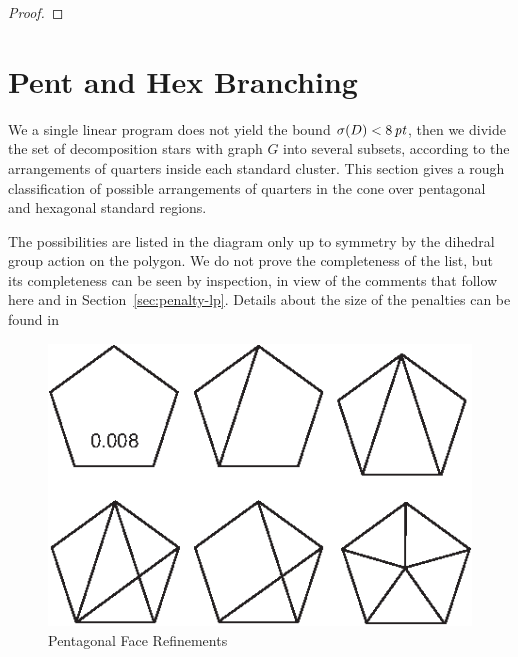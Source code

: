 \begin{proof} 
\end{proof}


\section{Pent and Hex Branching}

We a single linear program does not yield the bound
$\sigma(D)<8\,\hbox{\it pt}$, then we divide the set of decomposition stars
with graph $G$ into several subsets, according to the arrangements
of quarters inside each standard cluster.  This section gives a
rough classification of possible arrangements of quarters in the
cone over pentagonal and hexagonal standard regions.

The possibilities are listed in the diagram only up to symmetry by
the dihedral group action on the polygon.  We do not prove the
completeness of the list, but its completeness can be seen by
inspection, in view of the comments that follow here and in
Section~\ref{sec:penalty-lp}.  Details about the size of the
penalties can be found in 

\begin{figure}[htb]
  \centering
  \includegraphics{PS/penthex.eps}
  \caption{Pentagonal Face Refinements}
  \label{fig:penthex}
\end{figure}

